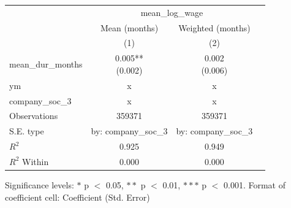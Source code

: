 \renewcommand\cellalign{t}
\begin{threeparttable}
\begin{tabular}{lccc}
\toprule
 & \multicolumn{2}{c}{mean_log_wage} \\
\cmidrule(lr){2-3} 
 & Mean (months) & Weighted (months) \\
 & (1) & (2) \\
\midrule
\addlinespace
mean_dur_months & \makecell{0.005** \\ (0.002)} & \makecell{0.002 \\ (0.006)} \\
\midrule
\addlinespace
ym & x & x \\
company_soc_3 & x & x \\
\midrule
\addlinespace
Observations & 359371 & 359371 \\
S.E. type & by: company_soc_3 & by: company_soc_3 \\
$R^2$ & 0.925 & 0.949 \\
$R^2$ Within & 0.000 & 0.000 \\
\bottomrule
\end{tabular}
\footnotesize Significance levels: $*$ p $<$ 0.05, $**$ p $<$ 0.01, $***$ p $<$ 0.001. Format of coefficient cell: Coefficient 
 (Std. Error)
\end{threeparttable}
